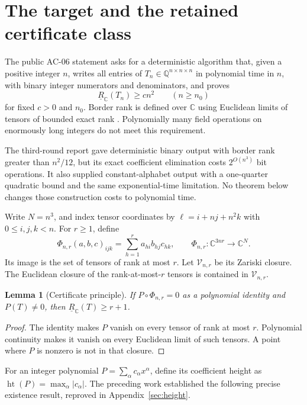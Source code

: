 \documentclass[11pt]{article}
\newtheorem{lemma}[theorem]{Lemma}
\theoremstyle{definition}
\theoremstyle{remark}
\newcommand{\C}{\mathbb C}
\newcommand{\Q}{\mathbb Q}
\newcommand{\BR}{\underline R_{\C}}
\newcommand{\height}{\operatorname{ht}}
\newcommand{\Var}{\mathcal V}
\begin{document}
\newpage
\tableofcontents
\newpage

\section{The target and the retained certificate class}

The public AC-06 statement asks for a deterministic algorithm that, given a positive integer $n$, writes all entries of $T_n\in\Q^{n\times n\times n}$ in polynomial time in $n$, with binary integer numerators and denominators, and proves
\begin{equation}\label{eq:target}
 \BR(T_n)\ge c n^2\qquad(n\ge n_0)
\end{equation}
for fixed $c>0$ and $n_0$. Border rank is defined over $\C$ using Euclidean limits of tensors of bounded exact rank \cite{repo}. Polynomially many field operations on enormously long integers do not meet this requirement.

The third-round report \cite{round3} gave deterministic binary output with border rank greater than $n^2/12$, but its exact coefficient elimination costs $2^{O(n^3)}$ bit operations. It also supplied constant-alphabet output with a one-quarter quadratic bound and the same exponential-time limitation. No theorem below changes those construction costs to polynomial time.

Write $N=n^3$, and index tensor coordinates by $\ell=i+nj+n^2k$ with $0\le i,j,k<n$. For $r\ge1$, define
\begin{equation}\label{eq:phi}
 \Phi_{n,r}(a,b,c)_{ijk}=\sum_{h=1}^{r}a_{hi}b_{hj}c_{hk},
 \qquad \Phi_{n,r}:\C^{3nr}\longrightarrow\C^N.
\end{equation}
Its image is the set of tensors of rank at most $r$. Let $\Var_{n,r}$ be its Zariski closure. The Euclidean closure of the rank-at-most-$r$ tensors is contained in $\Var_{n,r}$.

\begin{lemma}[Certificate principle]\label{lem:certificate}
If $P\circ\Phi_{n,r}=0$ as a polynomial identity and $P(T)\ne0$, then $\BR(T)\ge r+1$.
\end{lemma}
\begin{proof}
The identity makes $P$ vanish on every tensor of rank at most $r$. Polynomial continuity makes it vanish on every Euclidean limit of such tensors. A point where $P$ is nonzero is not in that closure.
\end{proof}

For an integer polynomial $P=\sum_\alpha c_\alpha x^\alpha$, define its coefficient height as $\height(P)=\max_\alpha|c_\alpha|$. The preceding work established the following precise existence result, reproved in Appendix~\ref{sec:height}.
\end{document}
